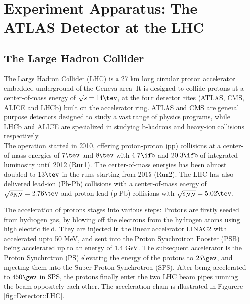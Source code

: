  \section{Experiment Apparatus:  The ATLAS Detector at the LHC} \label{sec::Detector}

\subsection{The Large Hadron Collider} 
The Large Hadron Collider (LHC) \cite{LHC} is a 27 km long circular proton accelerator embedded underground of the Geneva area.
It is designed to collide protons at a center-of-mass energy of $\sqrt{s} = 14 \tev$, at the four detector cites (ATLAS\cite{ATLAS_exp}, CMS\cite{CMS}, ALICE\cite{ALICE} and LHCb\cite{LHCb}) built on the accelerator ring. ATLAS and CMS are general purpose detectors designed to study a vast range of physics programs, while LHCb and ALICE are specialized in studying b-hadrons and heavy-ion collisions respectively. \\

The operation started in 2010, offering proton-proton (pp) collisions at a center-of-mass energies of $7\tev$ and $8\tev$ with $4.7\ifb$ and $20.3\ifb$ of integrated luminosity until 2012 (Run1). The center-of-mass energies has been almost doubled to $13\tev$
in the runs starting from 2015 (Run2). The LHC has also delivered lead-ion (Pb-Pb) collisions with a center-of-mass energy of $\sqrt{s_{NN}} = 2.76\tev$ and proton-lead (p-Pb) collisions with $\sqrt{s_{NN}} = 5.02\tev$.

% 


The acceleration of protons stages into various steps: 
Protons are firstly seeded from hydrogen gas, by blowing off the electrons from the hydrogen atoms using high electric field.
They are injected in the linear accelerator LINAC2 with accelerated upto 50 MeV, and sent into the Proton Synchrotron Booster (PSB) being accelerated up to an energy of 1.4 GeV. 
The subsequent accelerator is the Proton Synchrotron (PS) elevating the energy of the protons to $25\gev$, and injecting them into the Super Proton Synchrotron (SPS). After being accelerated to $450\gev$ in SPS, the protons finally enter the two LHC beam pipes running the beam oppositely each other. The acceleration chain is illustrated in Figurere \ref{fig::Detector::LHC}.

